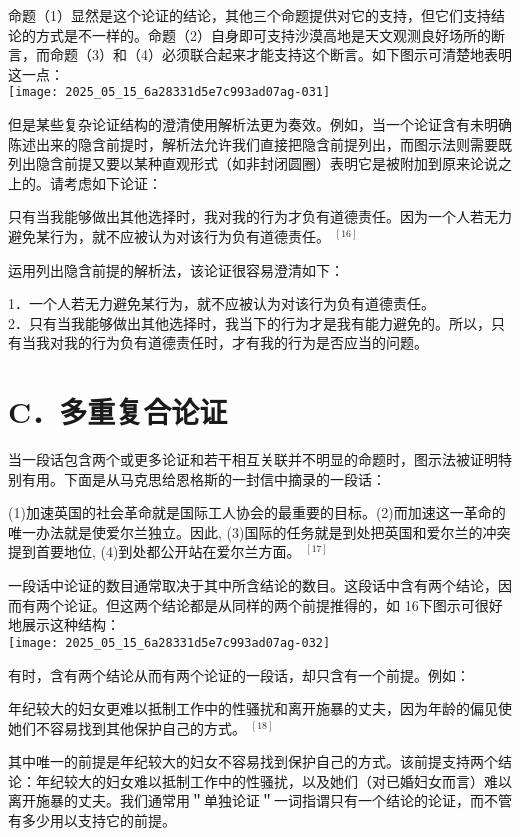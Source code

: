 命题（1）显然是这个论证的结论，其他三个命题提供对它的支持，但它们支持结论的方式是不一样的。命题（2）自身即可支持沙漠高地是天文观测良好场所的断言，而命题（3）和（4）必须联合起来才能支持这个断言。如下图示可清楚地表明这一点：\\
\texttt{[image: 2025\_05\_15\_6a28331d5e7c993ad07ag-031]}

但是某些复杂论证结构的澄清使用解析法更为奏效。例如，当一个论证含有未明确陈述出来的隐含前提时，解析法允许我们直接把隐含前提列出，而图示法则需要既列出隐含前提又要以某种直观形式（如非封闭圆圈）表明它是被附加到原来论说之上的。请考虑如下论证：

只有当我能够做出其他选择时，我对我的行为才负有道德责任。因为一个人若无力避免某行为，就不应被认为对该行为负有道德责任。 ${ }^{[16]}$

运用列出隐含前提的解析法，该论证很容易澄清如下：

1．一个人若无力避免某行为，就不应被认为对该行为负有道德责任。\\
2．只有当我能够做出其他选择时，我当下的行为才是我有能力避免的。所以，只有当我对我的行为负有道德责任时，才有我的行为是否应当的问题。

\section*{C．多重复合论证}
当一段话包含两个或更多论证和若干相互关联并不明显的命题时，图示法被证明特别有用。下面是从马克思给恩格斯的一封信中摘录的一段话：

\begin{displayquote}
(1)加速英国的社会革命就是国际工人协会的最重要的目标。(2)而加速这一革命的唯一办法就是使爱尔兰独立。因此, (3)国际的任务就是到处把英国和爱尔兰的冲突提到首要地位, (4)到处都公开站在爱尔兰方面。 ${ }^{[17]}$
\end{displayquote}

一段话中论证的数目通常取决于其中所含结论的数目。这段话中含有两个结论，因而有两个论证。但这两个结论都是从同样的两个前提推得的，如 16下图示可很好地展示这种结构：\\
\texttt{[image: 2025\_05\_15\_6a28331d5e7c993ad07ag-032]}

有时，含有两个结论从而有两个论证的一段话，却只含有一个前提。例如：

年纪较大的妇女更难以抵制工作中的性骚扰和离开施暴的丈夫，因为年龄的偏见使她们不容易找到其他保护自己的方式。 ${ }^{[18]}$

其中唯一的前提是年纪较大的妇女不容易找到保护自己的方式。该前提支持两个结论：年纪较大的妇女难以抵制工作中的性骚扰，以及她们（对已婚妇女而言）难以离开施暴的丈夫。我们通常用＂单独论证＂一词指谓只有一个结论的论证，而不管有多少用以支持它的前提。

